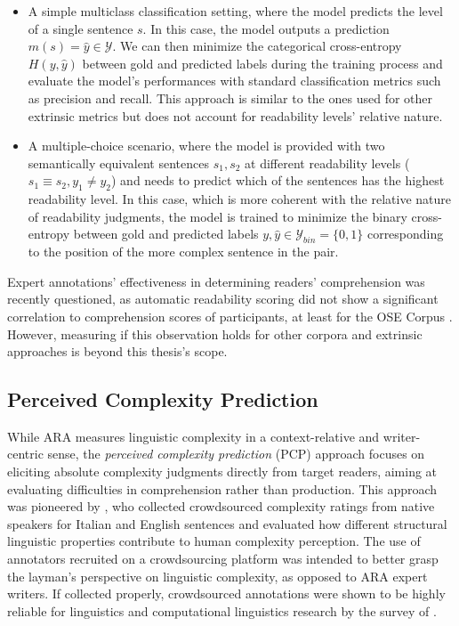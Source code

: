 \documentclass[a4paper, nobind]{templates/ociamthesis}
\begin{document}
\begin{itemize}
\item
  A simple multiclass classification setting, where the model predicts the level of a single sentence \(s\). In this case, the model outputs a prediction \(m(s) = \hat y \in \mathcal{Y}\). We can then minimize the categorical cross-entropy \(H(y, \hat y)\) between gold and predicted labels during the training process and evaluate the model's performances with standard classification metrics such as precision and recall. This approach is similar to the ones used for other extrinsic metrics but does not account for readability levels' relative nature.
\item
  A multiple-choice scenario, where the model is provided with two semantically equivalent sentences \(s_1, s_2\) at different readability levels (\(s_1 \equiv s_2, y_1 \neq y_2\)) and needs to predict which of the sentences has the highest readability level. In this case, which is more coherent with the relative nature of readability judgments, the model is trained to minimize the binary cross-entropy between gold and predicted labels \(y, \hat y \in \mathcal{Y}_{bin} = \{0,1\}\) corresponding to the position of the more complex sentence in the pair.
\end{itemize}

Expert annotations' effectiveness in determining readers' comprehension was recently questioned, as automatic readability scoring did not show a significant correlation to comprehension scores of participants, at least for the OSE Corpus \autocite{vajjala-lucic-2019-understanding}. However, measuring if this observation holds for other corpora and extrinsic approaches is beyond this thesis's scope.

\hypertarget{subsubchap:pc}{%
\subsection{Perceived Complexity Prediction}\label{subsubchap:pc}}

While ARA measures linguistic complexity in a context-relative and writer-centric sense, the \emph{perceived complexity prediction} (PCP) approach focuses on eliciting absolute complexity judgments directly from target readers, aiming at evaluating difficulties in comprehension rather than production. This approach was pioneered by \textcite{brunato-etal-2018-sentence}, who collected crowdsourced complexity ratings from native speakers for Italian and English sentences and evaluated how different structural linguistic properties contribute to human complexity perception. The use of annotators recruited on a crowdsourcing platform was intended to better grasp the layman's perspective on linguistic complexity, as opposed to ARA expert writers. If collected properly, crowdsourced annotations were shown to be highly reliable for linguistics and computational linguistics research by the survey of \textcite{munro-etal-2010-crowdsourcing}.
\end{document}
